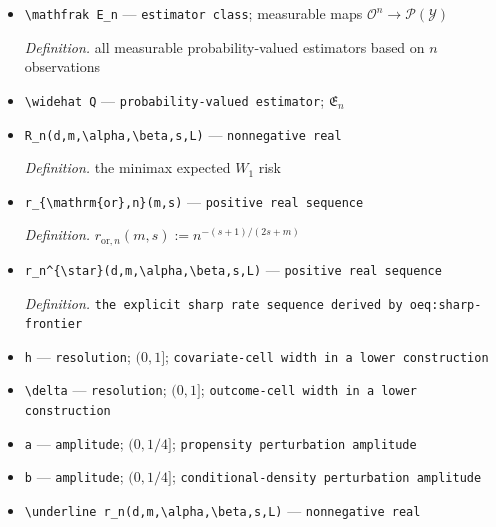 \documentclass{article}
\begin{document}
\begin{itemize}
  \item \texttt{\textbackslash{}\allowbreak{}mathfrak E\_\allowbreak{}n} --- \texttt{estimator class}; measurable maps \(\mathcal O^n\to\mathcal P(\mathcal Y)\)
  \par\smallskip\noindent\emph{Definition.} all measurable probability-valued estimators based on \(n\) observations
  \item \texttt{\textbackslash{}\allowbreak{}widehat Q} --- \texttt{probability-\allowbreak{}valued estimator}; \(\mathfrak E_n\)
  \item \texttt{R\_\allowbreak{}n(d,\allowbreak{}m,\allowbreak{}\textbackslash{}\allowbreak{}alpha,\allowbreak{}\textbackslash{}\allowbreak{}beta,\allowbreak{}s,\allowbreak{}L)} --- \texttt{nonnegative real}
  \par\smallskip\noindent\emph{Definition.} the minimax expected \(W_1\) risk
  \item \texttt{r\_\allowbreak{}\{\textbackslash{}\allowbreak{}mathrm\{or\}\allowbreak{},\allowbreak{}n\}\allowbreak{}(m,\allowbreak{}s)} --- \texttt{positive real sequence}
  \par\smallskip\noindent\emph{Definition.} \(r_{\mathrm{or},n}(m,s):=n^{-(s+1)/(2s+m)}\)
  \item \texttt{r\_\allowbreak{}n\textasciicircum{}\{\textbackslash{}\allowbreak{}star\}\allowbreak{}(d,\allowbreak{}m,\allowbreak{}\textbackslash{}\allowbreak{}alpha,\allowbreak{}\textbackslash{}\allowbreak{}beta,\allowbreak{}s,\allowbreak{}L)} --- \texttt{positive real sequence}
  \par\smallskip\noindent\emph{Definition.} \texttt{the explicit sharp rate sequence derived by oeq:\allowbreak{}sharp-\allowbreak{}frontier}
  \item \texttt{h} --- \texttt{resolution}; \((0,1]\); \texttt{covariate-\allowbreak{}cell width in a lower construction}
  \item \texttt{\textbackslash{}\allowbreak{}delta} --- \texttt{resolution}; \((0,1]\); \texttt{outcome-\allowbreak{}cell width in a lower construction}
  \item \texttt{a} --- \texttt{amplitude}; \((0,1/4]\); \texttt{propensity perturbation amplitude}
  \item \texttt{b} --- \texttt{amplitude}; \((0,1/4]\); \texttt{conditional-\allowbreak{}density perturbation amplitude}
  \item \texttt{\textbackslash{}\allowbreak{}underline r\_\allowbreak{}n(d,\allowbreak{}m,\allowbreak{}\textbackslash{}\allowbreak{}alpha,\allowbreak{}\textbackslash{}\allowbreak{}beta,\allowbreak{}s,\allowbreak{}L)} --- \texttt{nonnegative real}

\end{itemize}
\end{document}
